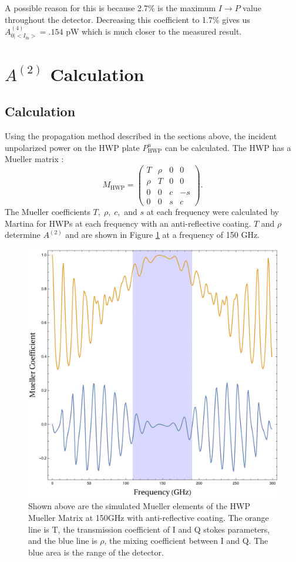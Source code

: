 \documentclass{article}
\theoremstyle{remark}
\newcommand{\tab}{\hspace*{2em}}
\renewcommand{\t}[1]{\text{#1}}
\newcommand{\AI}{A^{(4)}_{0|<I_{\t{in}}>}}
\newcommand{\A}[1]{A^{(#1)}}
\newcommand{\ip}{$I\rightarrow P$ }
\begin{document}
\tab A possible reason for this is because 2.7\% is the maximum \ip value throughout the detector. 
Decreasing this coefficient to 1.7\% gives us $\AI = .154 \t{ pW}$ which is much closer to the measured result.





\section{$\A2$ Calculation}
\subsection{Calculation}
\tab Using the propagation method described in the sections above, the incident unpolarized power on the HWP plate $P^u_\t{HWP}$ can be calculated. 
The HWP has a Mueller matrix :
\[
M_\t{HWP} = \left(
\begin{array}{cccc}
T & \rho & 0 & 0 \\
\rho & T & 0 & 0 \\
0 & 0 & c & -s\\
0 & 0 & s & c
\end{array}
\right).
\]
The Mueller coefficients $T,\; \rho,\;c,$ and $s$ at each frequency were calculated by Martina for HWPs at each frequency with an anti-reflective coating.
$T$ and $\rho$ determine $\A2$ and are shown in Figure \ref{fig:Mueller_Elements} at a frequency of 150 GHz.

\begin{figure}[t!]
	\centering
  \includegraphics[width=.6\linewidth]{images/Mueller_150GHz.pdf}
  \caption{Shown above are the simulated Mueller elements of the HWP Mueller Matrix at 150GHz with anti-reflective coating. 
  	The orange line is T, the transmission coefficient of I and Q stokes parameters, and the blue line is 
  	$\rho$, the mixing coefficient between I and Q. The blue area is the range of the detector.}
  \label{fig:Mueller_Elements}
\end{figure}
\end{document}
